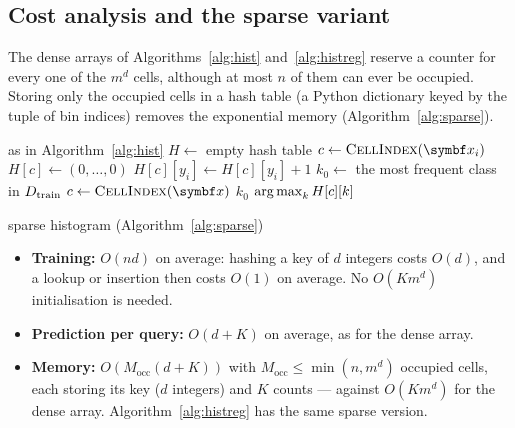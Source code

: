 \documentclass[11pt]{article}
\begin{document}
\subsection{Cost analysis and the sparse variant}\label{sec:cost}

The dense arrays of Algorithms~\ref{alg:hist} and~\ref{alg:histreg} reserve a counter for every one of the $m^d$ cells,
although at most $n$ of them can ever be occupied. Storing only the occupied cells in a hash table (a Python
dictionary keyed by the tuple of bin indices) removes the exponential memory (Algorithm~\ref{alg:sparse}).

\begin{algorithm}[htbp]
\caption{Sparse histogram classifier: a hash table of occupied cells}
\label{alg:sparse}
\small
\begin{algorithmic}[1]
\Require as in Algorithm~\ref{alg:hist}
  \State $H \gets$ empty hash table 
    \State $c \gets \Call{CellIndex}{\x_i}$
     \State $H[c] \gets (0, \dots, 0)$  \EndIf
    \State $H[c][y_i] \gets H[c][y_i] + 1$
  \EndFor
  \State $k_0 \gets$ the most frequent class in $D_{\mathrm{train}}$
\EndFunction
{}
  \State $c \gets \Call{CellIndex}{\x}$
   \Return $k_0$  \EndIf
  \State \Return $\operatorname*{arg\,max}_k H[c][k]$
\EndFunction
\end{algorithmic}
\end{algorithm}


\begin{runtime}{sparse histogram (Algorithm~\ref{alg:sparse})}
\begin{itemize}[leftmargin=1.2em]
\item \textbf{Training:} $O(nd)$ on average: hashing a key of $d$ integers costs $O(d)$, and a lookup or insertion
then costs $O(1)$ on average. No $O(Km^d)$ initialisation is needed.
\item \textbf{Prediction per query:} $O(d + K)$ on average, as for the dense array.
\item \textbf{Memory:} $O(M_{\mathrm{occ}}(d + K))$ with $M_{\mathrm{occ}} \le \min(n, m^d)$ occupied cells, each storing
its key ($d$ integers) and $K$ counts --- against $O(Km^d)$ for the dense array. Algorithm~\ref{alg:histreg} has the
same sparse version.
\end{itemize}
\end{runtime}
\end{document}
